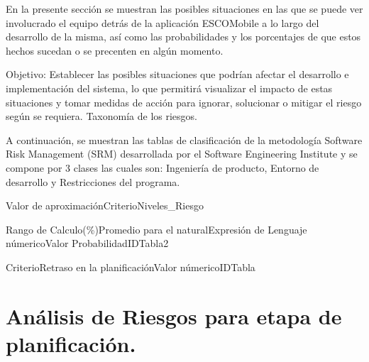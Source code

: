 \noindent
En la presente sección se muestran las posibles situaciones en las que se puede ver involucrado el equipo detrás de la 
aplicación ESCOMobile a lo largo del desarrollo de la misma, así como las probabilidades y los porcentajes de que estos hechos
sucedan o se precenten en algún momento.

\noindent
Objetivo: Establecer las posibles situaciones que podrían afectar el desarrollo e
implementación del sistema, lo que permitirá visualizar el impacto de estas situaciones y
tomar medidas de acción para ignorar, solucionar o mitigar el riesgo según se requiera.
Taxonomía de los riesgos.

\noindent
\newline
A continuación, se muestran las tablas de clasificación de la metodología Software Risk
Management (SRM) desarrollada por el Software Engineering Institute y se compone por
3 clases las cuales son: Ingeniería de producto, Entorno de desarrollo y Restricciones del
programa.\cite{Riesgos}

\begin{tablaCC}{Valor de aproximación}{Criterio}{Niveles_Riesgo}
	\caption{Niveles de riesgo.}
\end{tablaCC}

\begin{tablaCCCC}{Rango de Calculo(\%)}{Promedio para el natural}{Expresión de Lenguaje númerico}{Valor Probabilidad}{IDTabla2}
	\caption{Estimación de la probabilidad.}
\end{tablaCCCC}

\begin{tablaCCC}{Criterio}{Retraso en la planificación}{Valor númerico}{IDTabla}

	\caption{Exposición de tiempo.}
\end{tablaCCC}

\section{Análisis de Riesgos para etapa de planificación.}

